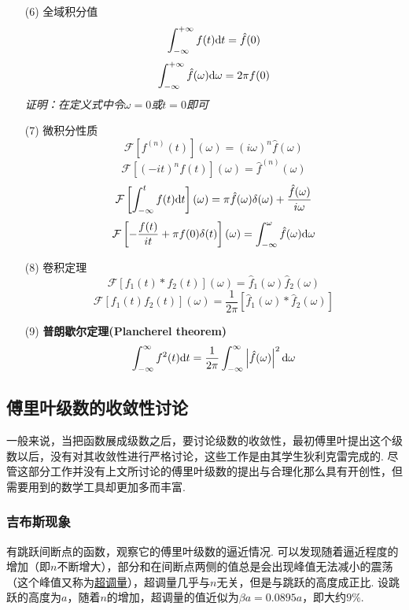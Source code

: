 \documentclass[main.tex]{subfiles}
\begin{document}
\begin{itemize}
    \item [(6)] 全域积分值
    \[ \int_{-\infty}^{+\infty}f(t){\rm d}t = \hat{f}(0)\]
    \[ \int_{-\infty}^{+\infty}\hat{f}(\omega){\rm d}\omega = 2\pi f(0)\]
    \textit{证明：在定义式中令\(\omega=0\)或\(t=0\)即可}
    \item [(7)] 微积分性质
    \[ \mathcal{F}\left[f^{(n)}(t)\right](\omega) = (i\omega)^n \hat{f}(\omega) \]
    \[ \mathcal{F}\left[(-it)^nf(t)\right](\omega) = \hat{f}^{(n)}(\omega)\]
    \[ \mathcal{F}\left[\int_{-\infty}^t f(t){\rm d}t\right](\omega) = \pi \hat{f}(\omega)\delta(\omega)+\frac{\hat{f}(\omega)}{i\omega}\]
    \[ \mathcal{F}\left[-\frac{f(t)}{it}+\pi f(0)\delta(t)\right](\omega) = \int_{-\infty}^\omega \hat{f}(\omega){\rm d}\omega\]
    \item [(8)] 卷积定理
    \[ \mathcal{F}\left[f_1(t)*f_2(t)\right](\omega) = \hat{f}_1(\omega)\hat{f}_2(\omega)\]
    \[ \mathcal{F}\left[f_1(t)f_2(t)\right](\omega) = \frac{1}{2\pi}[\hat{f}_1(\omega) * \hat{f}_2(\omega)]\]
    \item [(9)] \textbf{普朗歇尔定理(Plancherel theorem)}
    \[\int_{-\infty}^{\infty}f^2(t){\rm d}t = \frac{1}{2\pi}\int_{-\infty}^{\infty}\left|\hat{f}(\omega)\right|^2{\rm d}\omega\]
\end{itemize}

\subsection{傅里叶级数的收敛性讨论}

一般来说，当把函数展成级数之后，要讨论级数的收敛性，最初傅里叶提出这个级数以后，没有对其收敛性进行严格讨论，这些工作是由其学生狄利克雷完成的. 尽管这部分工作并没有上文所讨论的傅里叶级数的提出与合理化那么具有开创性，但需要用到的数学工具却更加多而丰富.

\subsubsection{吉布斯现象}

有跳跃间断点的函数，观察它的傅里叶级数的逼近情况. 
可以发现随着逼近程度的增加（即\(n\)不断增大），部分和在间断点两侧的值总是会出现峰值无法减小的震荡（这个峰值又称为\uline{超调量}），超调量几乎与\(n\)无关，但是与跳跃的高度成正比. 设跳跃的高度为\(a\)，随着\(n\)的增加，超调量的值近似为\(\beta a=0.0895a\)，即大约\(9\%\).
\end{document}
